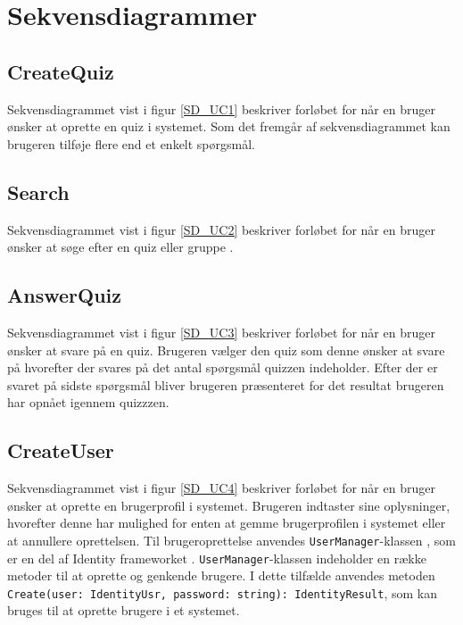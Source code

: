 \section{Sekvensdiagrammer}

\subsection*{CreateQuiz}
Sekvensdiagrammet vist i figur \ref{SD_UC1} beskriver forløbet for når en bruger ønsker at oprette en quiz i systemet. Som det fremgår af sekvensdiagrammet kan brugeren tilføje flere end et enkelt spørgsmål.


\subsection*{Search}
Sekvensdiagrammet vist i figur \ref{SD_UC2} beskriver forløbet for når en bruger ønsker at søge efter en quiz eller gruppe .


\subsection*{AnswerQuiz}
Sekvensdiagrammet vist i figur \ref{SD_UC3} beskriver forløbet for når en bruger ønsker at svare på en quiz. Brugeren vælger den quiz som denne ønsker at svare på hvorefter der svares på det antal spørgsmål quizzen indeholder. Efter der er svaret på sidste spørgsmål bliver brugeren præsenteret for det resultat brugeren har opnået igennem quizzzen.


\subsection*{CreateUser}
Sekvensdiagrammet vist i figur \ref{SD_UC4} beskriver forløbet for når en bruger ønsker at oprette en brugerprofil i systemet. Brugeren indtaster sine oplysninger, hvorefter denne har mulighed for enten at gemme brugerprofilen i systemet eller at annullere oprettelsen. Til brugeroprettelse anvendes \verb+UserManager+-klassen \citep{usermanager}, som er en del af Identity frameworket \citep{netidentityWeb}. \verb+UserManager+-klassen indeholder en række metoder til at oprette og genkende brugere. I dette tilfælde anvendes metoden \verb+Create(user: IdentityUsr, password: string): IdentityResult+, som kan bruges til at oprette brugere i et systemet.

